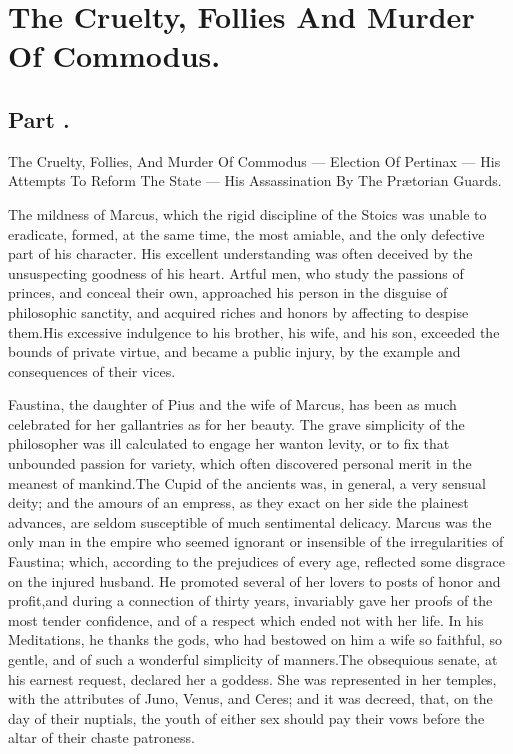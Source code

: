 \chapter{The Cruelty, Follies And Murder Of Commodus.}
\section{Part \thesection.}

The Cruelty, Follies, And Murder Of Commodus — Election Of
Pertinax — His Attempts To Reform The State — His Assassination By The
Prætorian Guards.
\vspace{\onelineskip}

The mildness of Marcus, which the rigid discipline of the Stoics
was unable to eradicate, formed, at the same time, the most
amiable, and the only defective part of his character. His
excellent understanding was often deceived by the unsuspecting
goodness of his heart. Artful men, who study the passions of
princes, and conceal their own, approached his person in the
disguise of philosophic sanctity, and acquired riches and honors
by affecting to despise them.\footnotemark[1] His excessive indulgence to his
brother, \footnotemark[105] his wife, and his son, exceeded the bounds of
private virtue, and became a public injury, by the example and
consequences of their vices.



Faustina, the daughter of Pius and the wife of Marcus, has been
as much celebrated for her gallantries as for her beauty. The
grave simplicity of the philosopher was ill calculated to engage
her wanton levity, or to fix that unbounded passion for variety,
which often discovered personal merit in the meanest of mankind.\footnotemark[2]
The Cupid of the ancients was, in general, a very sensual
deity; and the amours of an empress, as they exact on her side
the plainest advances, are seldom susceptible of much sentimental
delicacy. Marcus was the only man in the empire who seemed
ignorant or insensible of the irregularities of Faustina; which,
according to the prejudices of every age, reflected some disgrace
on the injured husband. He promoted several of her lovers to
posts of honor and profit,\footnotemark[3] and during a connection of thirty
years, invariably gave her proofs of the most tender confidence,
and of a respect which ended not with her life. In his
Meditations, he thanks the gods, who had bestowed on him a wife
so faithful, so gentle, and of such a wonderful simplicity of
manners.\footnotemark[4] The obsequious senate, at his earnest request,
declared her a goddess. She was represented in her temples, with
the attributes of Juno, Venus, and Ceres; and it was decreed,
that, on the day of their nuptials, the youth of either sex
should pay their vows before the altar of their chaste patroness.\footnotemark[5]

